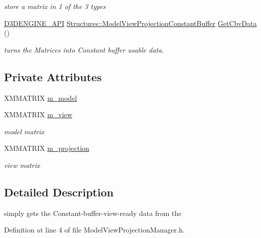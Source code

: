 \begin{DoxyCompactItemize}
\begin{DoxyCompactList}\small\item\em store a matrix in 1 of the 3 types \end{DoxyCompactList}\item 
\mbox{\hyperlink{stdafx_8h_a8ee2d990c5dfba7794dd2b60741d7722}{D3\+D\+E\+N\+G\+I\+N\+E\+\_\+\+A\+PI}} \mbox{\hyperlink{struct_structures_1_1_model_view_projection_constant_buffer}{Structures\+::\+Model\+View\+Projection\+Constant\+Buffer}} \mbox{\hyperlink{class_model_view_projection_manager_a7f7cb0b403869c68d96b1c3925cd930c}{Get\+Cbv\+Data}} ()
\begin{DoxyCompactList}\small\item\em turns the Matrices into Constant buffer usable data. \end{DoxyCompactList}\end{DoxyCompactItemize}
\subsection*{Private Attributes}
\begin{DoxyCompactItemize}
\item 
X\+M\+M\+A\+T\+R\+IX \mbox{\hyperlink{class_model_view_projection_manager_af5b11770293ecea8efcddb473532270d}{m\+\_\+model}}
\item 
X\+M\+M\+A\+T\+R\+IX \mbox{\hyperlink{class_model_view_projection_manager_a67704be9c327d11ef3b04b9d535ce5bf}{m\+\_\+view}}
\begin{DoxyCompactList}\small\item\em model matrix \end{DoxyCompactList}\item 
X\+M\+M\+A\+T\+R\+IX \mbox{\hyperlink{class_model_view_projection_manager_a133f02be971dd08a102883df4373b95d}{m\+\_\+projection}}
\begin{DoxyCompactList}\small\item\em view matrix \end{DoxyCompactList}\end{DoxyCompactItemize}


\subsection{Detailed Description}
simply gets the Constant-\/buffer-\/view-\/ready data from the 

Definition at line 4 of file Model\+View\+Projection\+Manager.\+h.



